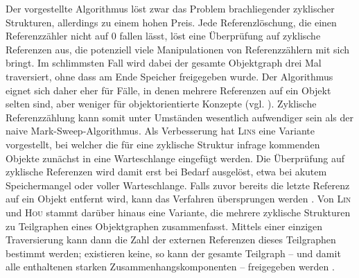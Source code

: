 Der vorgestellte Algorithmus löst zwar das Problem brachliegender zyklischer Strukturen, allerdings zu einem hohen Preis.
Jede Referenzlöschung, die einen Referenzzähler nicht auf $0$ fallen lässt, löst eine Überprüfung auf zyklische Referenzen aus, die potenziell viele Manipulationen von Referenzzählern mit sich bringt.
Im schlimmsten Fall wird dabei der gesamte Objektgraph drei Mal traversiert, ohne dass am Ende Speicher freigegeben wurde.
Der Algorithmus eignet sich daher eher für Fälle, in denen mehrere Referenzen auf ein Objekt selten sind, aber weniger für objektorientierte Konzepte (vgl. \cite[S. 215]{lins1992}).
Zyklische Referenzzählung kann somit unter Umständen wesentlich aufwendiger sein als der naive Mark-Sweep-Algorithmus.
Als Verbesserung hat \textsc{Lins} eine Variante vorgestellt, bei welcher die für eine zyklische Struktur infrage kommenden Objekte zunächst in eine Warteschlange eingefügt werden.
Die Überprüfung auf zyklische Referenzen wird damit erst bei Bedarf ausgelöst, etwa bei akutem Speichermangel oder voller Warteschlange.
Falls zuvor bereits die letzte Referenz auf ein Objekt entfernt wird, kann das Verfahren übersprungen werden \cite{lins1992}.
Von \textsc{Lin} und \textsc{Hou} stammt darüber hinaus eine Variante, die mehrere zyklische Strukturen zu Teilgraphen eines Objektgraphen zusammenfasst.
Mittels einer einzigen Traversierung kann dann die Zahl der externen Referenzen dieses Teilgraphen bestimmt werden; existieren keine, so kann der gesamte Teilgraph -- und damit alle enthaltenen starken Zusammenhangskomponenten -- freigegeben werden \cite{linhou2006}.




